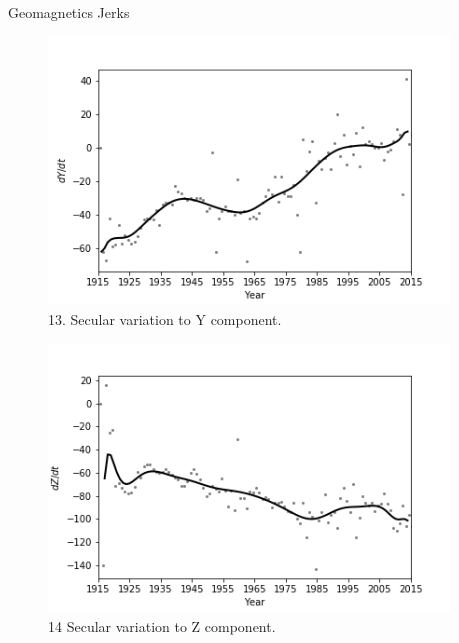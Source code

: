 \documentclass[final,t]{beamer}
\begin{document}
\begin{columns}[t]
\begin{column}{.66\linewidth}
\begin{columns}
\begin{column}{.31\linewidth}
\begin{block}{Geomagnetics Jerks}
		\begin{figure}
			\centering
			\includegraphics[width=0.7\linewidth]{spline100sv_y_spline}
			\caption{13. Secular variation to Y component.}
			\label{SPLINEy}
		\end{figure}
		
		\begin{figure}
			\centering
			\includegraphics[width=0.7\linewidth]{spline100sv_z_spline}
			\caption{14 Secular variation to Z component.}
			\label{Splinez}
		\end{figure}
		
		
		
		
		
		
	\end{block}
\end{column}	

\end{columns}

\end{column}
\begin{column}{.33\linewidth}



\end{column}
\end{columns}
\end{document}
